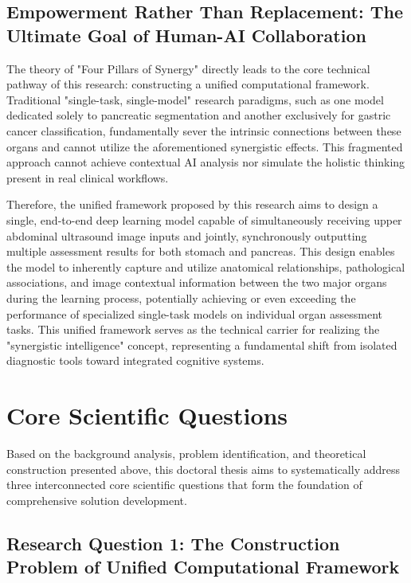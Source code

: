 \subsection{Empowerment Rather Than Replacement: The Ultimate Goal of Human-AI Collaboration}

The theory of "Four Pillars of Synergy" directly leads to the core technical pathway of this research: constructing a unified computational framework. Traditional "single-task, single-model" research paradigms, such as one model dedicated solely to pancreatic segmentation and another exclusively for gastric cancer classification, fundamentally sever the intrinsic connections between these organs and cannot utilize the aforementioned synergistic effects. This fragmented approach cannot achieve contextual AI analysis nor simulate the holistic thinking present in real clinical workflows.

Therefore, the unified framework proposed by this research aims to design a single, end-to-end deep learning model capable of simultaneously receiving upper abdominal ultrasound image inputs and jointly, synchronously outputting multiple assessment results for both stomach and pancreas. This design enables the model to inherently capture and utilize anatomical relationships, pathological associations, and image contextual information between the two major organs during the learning process, potentially achieving or even exceeding the performance of specialized single-task models on individual organ assessment tasks. This unified framework serves as the technical carrier for realizing the "synergistic intelligence" concept, representing a fundamental shift from isolated diagnostic tools toward integrated cognitive systems.

\section{Core Scientific Questions}

Based on the background analysis, problem identification, and theoretical construction presented above, this doctoral thesis aims to systematically address three interconnected core scientific questions that form the foundation of comprehensive solution development.

\subsection{Research Question 1: The Construction Problem of Unified Computational Framework}

